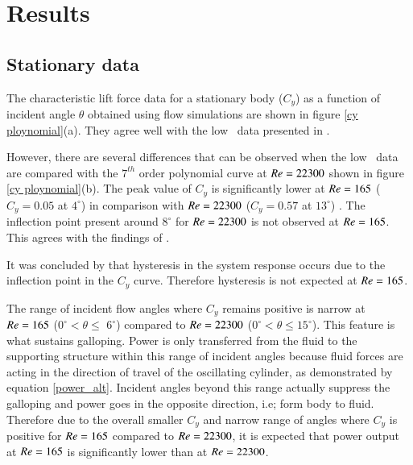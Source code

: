 \section{Results}
\label{sec:results}

\subsection{Stationary data}

The characteristic lift force data for a stationary body ($C_y$) as a function of incident angle $\theta$ obtained using flow simulations are shown in figure \ref{cy ploynomial}(a). They agree well with the low \reynoldsnumber\ data presented in \citet{Joly2012}.

However, there are several differences that can be observed when the low \reynoldsnumber\ data are compared with the $7^{th}$ order polynomial curve at $Re=22300$ shown in figure \ref{cy ploynomial}(b). The peak value of $C_y$ is  significantly lower at $Re=165$ ($C_y=0.05$ at $4^\circ$) in comparison with $Re=22300$ ($C_y=0.57$ at $13^\circ$) . The inflection point present around $8^\circ$ for $Re=22300$ is not observed at $Re=165$. This agrees with the findings of \cite{Luo2003}. 

It was concluded by \cite{Luo2003} that hysteresis in the system response occurs due to the inflection point in the $C_y$ curve. Therefore hysteresis is not expected at $Re=165$.

The range of incident flow angles where $C_y$ remains positive is narrow at $Re=165$ ($0^\circ <\theta \leq$ $6^\circ$) compared to $Re=22300$ ($0^\circ <\theta \leq 15^\circ$). This feature is what sustains galloping. Power is only transferred from the fluid to the supporting structure within this range of incident angles because fluid forces are acting in the direction of travel of the oscillating cylinder, as demonstrated by equation \ref{power_alt}. Incident angles beyond this range actually suppress the galloping and power goes in the opposite direction, i.e; form body to fluid. Therefore due to the overall smaller $C_y$ and narrow range of angles where $C_y$ is positive for $Re=165$ compared to $Re=22300$, it is expected that power output at $Re=165$ is significantly lower than at $Re=22300$. 

  



